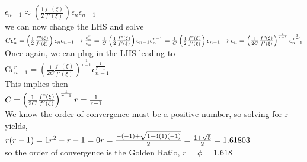 \documentclass{article}
\begin{document}
\(\epsilon _{n+1}\approx \left(\frac{1}{2}\frac{f\text{''}(\xi )}{f'(\xi )}\right)\epsilon _n\epsilon _{n-1}\)\\
we can now change the LHS and solve\\
\(C \epsilon _n^r=\left(\frac{1}{2}\frac{f\text{''}(\xi )}{f'(\xi )}\right)\epsilon _n\epsilon _{n-1}\to  \frac{ \epsilon _n^r}{\epsilon _n}=\frac{1}{C}\left(\frac{1}{2}\frac{f\text{''}(\xi
)}{f'(\xi )}\right)\epsilon _{n-1}\\
\\
 \epsilon _n^{r-1}=\frac{1}{C}\left(\frac{1}{2}\frac{f\text{''}(\xi )}{f'(\xi )}\right)\epsilon _{n-1}\to  \epsilon _n=\left(\frac{1}{2C}\frac{f\text{''}(\xi
)}{f'(\xi )}\right)^{\frac{1}{r-1}}\epsilon _{n-1}^{\frac{1}{r-1}}\)\\
Once again, we can plug in the LHS leading to\\
\(\text{C$\epsilon $}_{n-1}^r=\left(\frac{1}{2C}\frac{f\text{''}(\xi )}{f'(\xi )}\right)^{\frac{1}{r-1}}\epsilon _{n-1}^{\frac{1}{r-1}}\)\\
This implies then\\
\(C=\left(\frac{1}{2C}\frac{f\text{''}(\xi )}{f'(\xi )}\right)^{\frac{1}{r-1}}\\
\\
r=\frac{1}{r-1}\)\\
We know the order of convergence must be a positive number, so solving for r yields,\\
\(r(r-1)=1\\
\\
r^2-r-1=0\\
\\
r=\frac{-(-1)+\sqrt{1-4(1)(-1)}}{2}=\frac{1+\sqrt{5}}{2}=1.61803\)\\
so the order of convergence is the Golden Ratio, \(r=\phi =1.618\)
\end{document}
